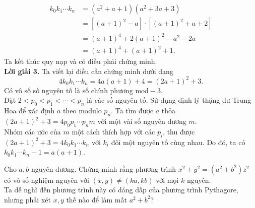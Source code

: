\begin{bt}[USA MO 2008]
{		\begin{align*}
		k_0k_1\cdots k_n &=\left(a^2+a+1\right)\left(a^2+3a+3\right)\\
		& =\left[(a+1)^2-a\right]\cdot\left[(a+1)^2+a+2\right]\\
		& = (a+1)^4+2(a+1)^2-a^2-2a\\
		&= (a+1)^4+(a+1)^2+1.
		\end{align*}
		Ta kết thúc quy nạp và có điều phải chứng minh.\\
		{\bf Lời giải 3.} Ta viết lại điều cần chứng minh dưới dạng $$4k_0k_1\cdots k_n=4a(a+1)+4=(2a+1)^2+3.$$
		Có vô số số nguyên tố là số chính phương $ \mathrm{mod}-3 $.\\
		Đặt $ 2<p_0<p_1<\cdots <p_n $ là các số nguyên tố. Sử dụng định lý thặng dư Trung Hoa để xác định $ a $ theo modulo $ p_n $. Ta tìm được $ a $ thỏa $ (2a+1)^2+3=4p_0p_1\cdots p_n m $ với một vài số nguyên dương $ m $.\\
		Nhóm các ước của $ m $ một cách thích hợp với các $ p_i $, thu được $ (2a+1)^2+3=4k_0k_1\cdots k_n $ với $ k_i $ đôi một nguyên tố cùng nhau. Do đó, ta có $ k_0k_1\cdots k_n-1=a(a+1) $.
	}
\end{bt}
\begin{bt}%
	Cho $ a, b $ nguyên dương. Chứng minh rằng phương trình $ x^2+y^2=\left(a^2+b^2\right)z^2 $ có vô số nghiệm nguyên với $ (x, y)\neq (ka, kb) $ với mọi $ k $ nguyên.\vspace{0.2cm}\\
	Ta dễ nghĩ đến phương trình này có dáng dấp của phương trình Pythagore, nhưng phải xét $ x, y $ thế nào để làm mất $ a^2+b^2 $?
\end{bt}
